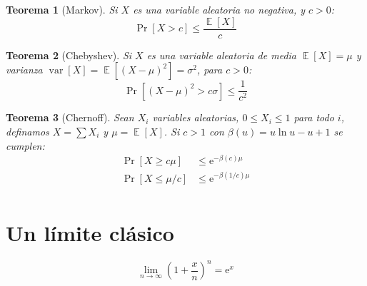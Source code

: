 \documentclass[english, spanish, fleqn]{article}
\newtheorem*{theorem}{Teorema}
\DeclareMathOperator{\var}{var}
\DeclareMathOperator{\Exp}{\mathbb{E}}
\begin{document}
  \begin{theorem}[Markov]
    Si \(X\) es una variable aleatoria no negativa,
    y \(c > 0\):
    \begin{equation*}
      \Pr[X > c]
        \le \frac{\Exp[X]}{c}
    \end{equation*}
  \end{theorem}
  \begin{theorem}[Chebyshev]
    Si \(X\) es una variable aleatoria de media \(\Exp[X] = \mu\)
    y varianza \(\var[X] = \Exp[(X - \mu)^2] = \sigma^2\),
    para \(c > 0\):
    \begin{equation*}
      \Pr[(X - \mu)^2 > c \sigma]
        \le \frac{1}{c^2}
    \end{equation*}
  \end{theorem}
  \begin{theorem}[Chernoff]
    Sean \(X_i\) variables aleatorias,
    \(0 \le X_i \le 1\) para todo \(i\),
    definamos \(X = \sum X_i\)
    y \(\mu = \Exp[X]\).
    Si \(c > 1\) con \(\beta(u) = u \ln u - u + 1\) se cumplen:
    \begin{align*}
      \Pr[X \ge c \mu]
        &\le \mathrm{e}^{- \beta(c) \mu} \\
      \Pr[X \le \mu / c]
        &\le \mathrm{e}^{- \beta(1 / c) \mu} \\
    \end{align*}
  \end{theorem}

\section*{Un límite clásico}
\label{sec:un-limite-clasico}

\begin{equation*}
  \lim_{n \to \infty} \left( 1 + \frac{x}{n} \right)^n
    = \mathrm{e}^x
\end{equation*}
\end{document}
